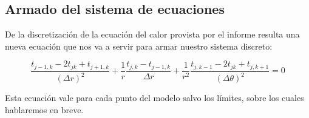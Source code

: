 

\subsection{Armado del sistema de ecuaciones}
De la discretización de la ecuación del calor provista por el informe resulta una nueva ecuación que nos va a servir para armar nuestro sistema discreto:

\begin{equation}\label{calor}
\frac{t_{j-1,k}-2t_{jk}+t_{j+1,k}}{(\Delta r)^2}+\frac{1}{r}\frac{t_{j,k}-t_{j-1,k}}{\Delta r}+\frac{1}{r^2}\frac{t_{j,k-1}-2t_{jk}+t_{j,k+1}}{(\Delta \theta)^2} = 0 
\end{equation}

Esta ecuación vale para cada punto del modelo salvo los límites, sobre los cuales hablaremos en breve.

